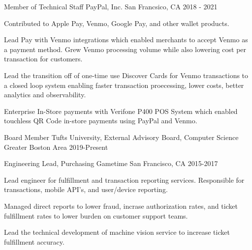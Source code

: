 
\begin{cventries}

  \cventry
    {Member of Technical Staff} %
    {PayPal, Inc.} %
    {San Francsico, CA} %
    {2018 - 2021} %
    {
      \begin{cvitems} %
        \item {Contributed to Apple Pay, Venmo, Google Pay, and other wallet products.}
        \item {Lead Pay with Venmo integrations which enabled merchants to accept Venmo as a payment method. Grew Venmo processing volume while also lowering cost per transaction for customers.}
        \item {Lead the transition off of one-time use Discover Cards for Venmo transactions to a closed loop system enabling faster transaction proecessing, lower costs, better analytics and observability.}
        \item {Enterprise In-Store payments with Verifone P400 POS System which enabled touchless QR Code in-store payments using PayPal and Venmo.}
      \end{cvitems}
    }

  \cventry
    {Board Member} %
    {Tufts University, External Advisory Board, Computer Science} %
    {Greater Boston Area} %
    {2019-Present} %
    {
      \begin{cvitems} %
      \end{cvitems}
    }

  \cventry
    {Engineering Lead, Purchasing} %
    {Gametime} %
    {San Francisco, CA} %
    {2015-2017} %
    {
      \begin{cvitems} %
        \item {Lead engineer for fulfillment and transaction reporting services. Responsible for transactions, mobile API's, and user/device reporting.}
        \item {Managed direct reports to lower fraud, incrase authorization rates, and ticket fulfillment rates to lower burden on customer support teams.}
        \item {Lead the technical development of machine vision service to increase ticket fulfillment accuracy.}
      \end{cvitems}
    }


\end{cventries}
